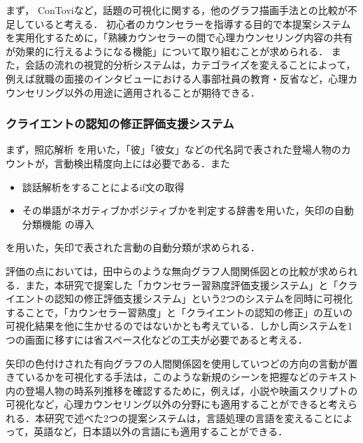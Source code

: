 \documentclass[shuuron]{kuee}
\begin{document}
まず，
ConTovi\cite{el2016contovi}など，話題の可視化に関する，他のグラフ描画手法との比較が不足していると考える．
初心者のカウンセラーを指導する目的で本提案システムを実用化するために，「熟練カウンセラーの間で心理カウンセリング内容の共有が効果的に行えるようになる機能」について取り組むことが求められる．
また，会話の流れの視覚的分析システムは，カテゴライズを変えることによって，例えば就職の面接のインタビューにおける人事部社員の教育・反省など，心理カウンセリング以外の用途に適用されることが期待できる．%

\subsubsection{クライエントの認知の修正評価支援システム}

まず，照応解析\cite{sasano2009probabilistic} \cite{sasano2011discriminative}を用いた，「彼」「彼女」などの代名詞で表された登場人物のカウントが，言動検出精度向上には必要である．また
\begin{itemize}
  \item 談話解析をすることによるif文の取得\cite{kishimoto}
  \item その単語がネガティブかポジティブかを判定する辞書を用いた，矢印の自動分類機能\cite{小林のぞみ2005意見抽出のための評価表現の収集} \cite{東山昌彦2008述語の選択選好性に着目した名詞評価極性の獲得} の導入
\end{itemize}
を用いた，矢印で表された言動の自動分類が求められる．

評価の点においては，田中ら\cite{tanaka}のような無向グラフ人間関係図との比較が求められる．また，本研究で提案した「カウンセラー習熟度評価支援システム」と「クライエントの認知の修正評価支援システム」という2つのシステムを同時に可視化することで，「カウンセラー習熟度」と「クライエントの認知の修正」の互いの可視化結果を他に生かせるのではないかとも考えている．しかし両システムを1つの画面に移すには省スペース化などの工夫が必要であると考える．

矢印の色付けされた有向グラフの人間関係図を使用していつどの方向の言動が置きているかを可視化する手法は，このような新規のシーンを把握などのテキスト内の登場人物の時系列推移を確認するために，例えば，小説や映画スクリプトの可視化など，心理カウンセリング以外の分野にも適用することができると考えられる．本研究で述べた2つの提案システムは，言語処理の言語を変えることによって，英語など，日本語以外の言語にも適用することができる．
\end{document}
